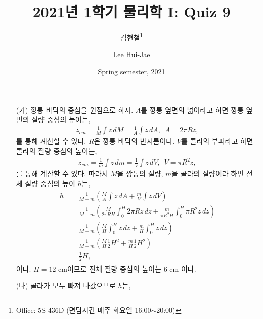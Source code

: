 \documentclass[floatfix,nofootinbib,superscriptaddress,fleqn]{revtex4-2}
\begin{document}
\title{\Large 2021년 1학기 물리학 I: Quiz 9}
\author{김현철\footnote{Office: 5S-436D (면담시간 매주
    화요일-16:00$\sim$20:00)}} 
\author{Lee Hui-Jae} 
\date{Spring semester, 2021}

\maketitle


\begin{itemize}
  \item[(가)] 깡통 바닥의 중심을 원점으로 하자. $A$를 깡통 옆면의 넓이라고 하면 
  깡통 옆면의 질량 중심의 높이는,
  \begin{align}
    z_{cm} =\frac{1}{M}\int z\,dM=\frac{1}{A}\int z\,dA,\,\,\, A =2\pi R z,
  \end{align}
  를 통해 계산할 수 있다. $R$은 깡통 바닥의 반지름이다.
   $V$를 콜라의 부피라고 하면 콜라의 질량 중심의 높이는,
  \begin{align}
    z_{cm} =\frac{1}{m}\int z\,dm=\frac{1}{V}\int z\,dV,\,\,\,V=\pi R^2 z,
  \end{align}
  를 통해 계산할 수 있다. 따라서 $M$을 깡통의 질량, $m$을 콜라의 질량이라 하면 
  전체 질량 중심의 높이 $h$는,
  \begin{align}
    \begin{split}
      h &= \frac{1}{M+m}\left(\frac{M}{A}\int z\,dA
      +\frac{m}{V}\int z\,dV\right) \\
       &= \frac{1}{M+m}\left(\frac{M}{2\pi R H}\int_0^H 2\pi R z\,dz
      +\frac{m}{\pi R^2 H}\int_0^H\pi R^2 z\,dz\right)  \\
      &= \frac{1}{M+m}\left(\frac{M}{H}\int_0^H z\,dz
      +\frac{m}{H}\int_0^H z\,dz\right) \\
      &= \frac{1}{M+m}\left(
        \frac{M}{H}\frac{1}{2}H^2
        +\frac{m}{H}\frac{1}{2}H^2
      \right)  \\
      &=\frac{1}{2}H,
    \end{split}
  \end{align}
  이다. $H=12$ cm이므로 전체 질량 중심의 높이는 6 cm 이다.
  \item[(나)] 콜라가 모두 빠져 나갔으므로 $h$는,

\end{itemize}
\end{document}
